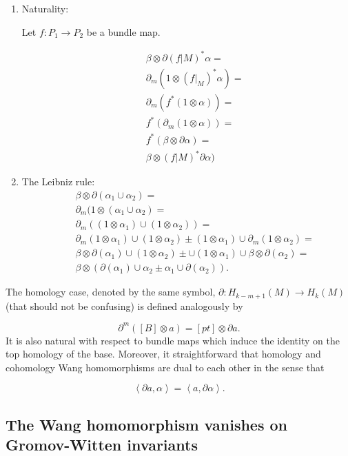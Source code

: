 \documentclass[a4paper,14pt]{article}
\newcommand{\al}{{\alpha}}
\newcommand{\be}{{\beta}}
\newcommand{\qed}{\rightline {$\Box $}}
\numberwithin{equation}{section}
\begin{document}
\begin{enumerate}

\item Naturality:

\noindent
Let $f:P_1\to P_2$ be a bundle map.

 
\begin{eqnarray*}
&&\be \otimes \partial (f|M)^*\al =\\
&&\partial _m(1 \otimes (f|_M)^*\al )=\\
&&\partial _m(f^*(1 \otimes \al))=\\
&&f^*(\partial _m(1 \otimes \al))=\\
&&f^*(\be \otimes \partial \al)=\\
&&\be \otimes (f|M)^*\partial \al)
\end{eqnarray*}

\item The Leibniz rule:
\begin{eqnarray*}
&&\be \otimes \partial (\al _1 \cup \al _2)=\\
&&\partial _m(1\otimes (\al _1 \cup \al _2)=\\
&&\partial _m((1\otimes \al _1)\cup (1\otimes \al _2))=\\
&&\partial _m(1\otimes \al _1) \cup (1\otimes \al _2) \pm
(1\otimes \al _1)\cup \partial _m(1\otimes \al _2)=\\
&&\be \otimes \partial (\al _1) \cup (1\otimes \al _2) \pm
\cup (1\otimes \al _1) \cup \be \otimes \partial (\al _2)=\\
&&\be \otimes (\partial (\al _1) \cup \al _2 \pm
\al _1 \cup \partial (\al _2)).
\end{eqnarray*}

\end{enumerate}
\qed


The homology case, denoted by the same symbol,
$\partial :H_{k-m+1}(M)\to H_k(M)$ (that should not be confusing)
is defined analogously by

$$\partial ^m([B]\otimes a) = [pt]\otimes \partial a.$$
It is also natural with respect to bundle maps which
induce the identity on the top homology of the base.
Moreover, it straightforward that homology and cohomology Wang homomorphisms
are dual to each other in the sense that

$$\left <\partial a,\al\right > = 
\left <a , \partial \al \right >.$$







\subsection{The Wang homomorphism vanishes on Gromov-Witten invariants}
\label{SS:main}
\end{document}
